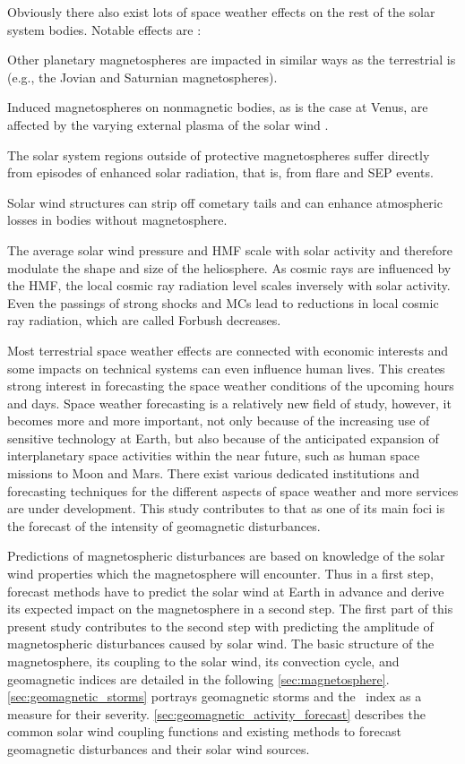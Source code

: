Obviously there also exist lots of space weather effects on the rest of the solar system bodies. Notable effects are \citep{Bothmer2007}:
\begin{itemize*}
	\item Other planetary magnetospheres are impacted in similar ways as the terrestrial is (e.g., the Jovian and Saturnian magnetospheres).
	\item Induced magnetospheres on nonmagnetic bodies, as is the case at Venus, are affected by the varying external plasma of the solar wind \citep{Luhmann2004}.
	\item The solar system regions outside of protective magnetospheres suffer directly from episodes of enhanced solar radiation, that is, from flare and SEP events.
	\item Solar wind structures can strip off cometary tails and can enhance atmospheric losses in bodies without magnetosphere.
	\item The average solar wind pressure and HMF scale with solar activity and therefore modulate the shape and size of the heliosphere. As cosmic rays are influenced by the HMF, the local cosmic ray radiation level scales inversely with solar activity. Even the passings of strong shocks and MCs lead to reductions in local cosmic ray radiation, which are called Forbush decreases.
\end{itemize*}

Most terrestrial space weather effects are connected with economic interests and some impacts on technical systems can even influence human lives. This creates strong interest in forecasting the space weather conditions of the upcoming hours and days. Space weather forecasting is a relatively new field of study, however, it becomes more and more important, not only because of the increasing use of sensitive technology at Earth, but also because of the anticipated expansion of interplanetary space activities within the near future, such as human space missions to Moon and Mars. There exist various dedicated institutions and forecasting techniques for the different aspects of space weather and more services are under development. This study contributes to that as one of its main foci is the forecast of the intensity of geomagnetic disturbances.

Predictions of magnetospheric disturbances are based on knowledge of the solar wind properties which the magnetosphere will encounter. Thus in a first step, forecast methods have to predict the solar wind at Earth in advance and derive its expected impact on the magnetosphere in a second step. The first part of this present study contributes to the second step with predicting the amplitude of magnetospheric disturbances caused by solar wind. The basic structure of the magnetosphere, its coupling to the solar wind, its convection cycle, and geomagnetic indices are detailed in the following \autoref{sec:magnetosphere}. \autoref{sec:geomagnetic_storms} portrays geomagnetic storms and the \Kp~index as a measure for their severity. \autoref{sec:geomagnetic_activity_forecast} describes the common solar wind coupling functions and existing methods to forecast geomagnetic disturbances and their solar wind sources.


